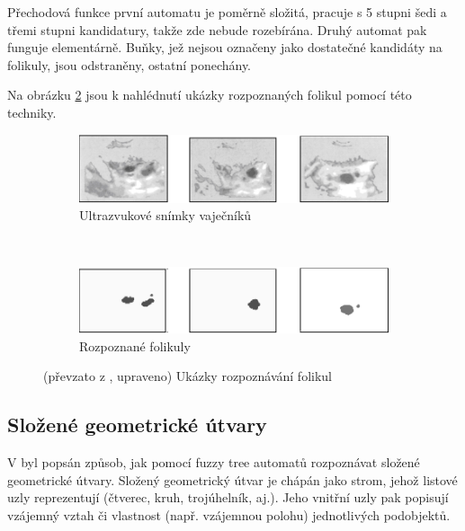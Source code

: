 \documentclass[a4paper,10pt]{article}
\begin{document}
Přechodová funkce první automatu je poměrně složitá, pracuje s 5 stupni šedi a třemi stupni kandidatury, takže zde nebude rozebírána. Druhý automat pak funguje elementárně. Buňky, jež nejsou označeny jako dostatečné kandidáty na folikuly, jsou odstraněny, ostatní ponechány.

Na obrázku \ref{img:Follicles} jsou k nahlédnutí ukázky rozpoznaných folikul pomocí této techniky.

\begin{figure}
  \begin{subfigure}[t]{\textwidth} \centering
    \includegraphics[width=\textwidth]{follicles-1}
    \caption{Ultrazvukové snímky vaječníků} \label{img:Follicles:Screens}
  \end{subfigure}
  \\
  \begin{subfigure}[t]{\textwidth} \centering
    \includegraphics[width=\textwidth]{follicles-2}
    \caption{Rozpoznané folikuly}
  \end{subfigure}
 
  \caption{(převzato z \cite{WanJiaZhoDu-ImProcBasFuzCelAuMod}, upraveno) Ukázky rozpoznávání folikul} \label{img:Follicles}
\end{figure}

\subsection{Složené geometrické útvary}

V \cite{Lee-FuzTreAutSynPatRec} byl popsán způsob, jak pomocí fuzzy tree automatů rozpoznávat složené geometrické útvary. Složený geometrický útvar je chápán jako strom, jehož listové uzly reprezentují  (čtverec, kruh, trojúhelník, aj.). Jeho vnitřní uzly pak popisují vzájemný vztah či vlastnost (např. vzájemnou polohu) jednotlivých podobjektů.
\end{document}
